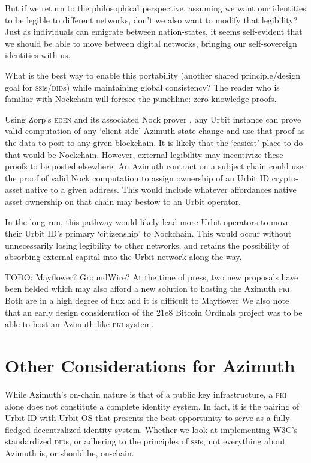 \documentclass[twoside]{article}
\begin{document}
But if we return to the philosophical perspective, assuming we want our identities to be legible to different networks, don't we also want to modify that legibility? Just as individuals can emigrate between nation-states, it seems self-evident that we should be able to move between digital networks, bringing our self-sovereign identities with us.

What is the best way to enable this portability (another shared principle/design goal for \textsc{ssi}s/\textsc{did}s) while maintaining global consistency? The reader who is familiar with Nockchain will foresee the punchline:  zero-knowledge proofs.

Using Zorp's \textsc{eden} and its associated Nock prover \citep{Zorp2023}, any Urbit instance can prove valid computation of any `client-side' Azimuth state change and use that proof as the data to post to any given blockchain. It is likely that the `easiest' place to do that would be Nockchain. However, external legibility may incentivize these proofs to be posted elsewhere. An Azimuth contract on a subject chain could use the proof of valid Nock computation to assign ownership of an Urbit ID crypto-asset native to a given address. This would include whatever affordances native asset ownership on that chain may bestow to an Urbit operator.

In the long run, this pathway would likely lead more Urbit operators to move their Urbit ID's primary `citizenship' to Nockchain. This would occur without unnecessarily losing legibility to other networks, and retains the possibility of absorbing external capital into the Urbit network along the way.

TODO: Mayflower? GroundWire?
At the time of press, two new proposals have been fielded which may also afford a new solution to hosting the Azimuth \textsc{pki}.  Both are in a high degree of flux and it is difficult to   Mayflower
We also note that an early design consideration of the 21e8 Bitcoin Ordinals project was to be able to host an Azimuth-like \textsc{pki} system.

\section{Other Considerations for Azimuth}

While Azimuth's on-chain nature is that of a public key infrastructure, a \textsc{pki} alone does not constitute a complete identity system. In fact, it is the pairing of Urbit ID with Urbit OS that presents the best opportunity to serve as a fully-fledged decentralized identity system. Whether we look at implementing W3C's standardized \textsc{did}s, or adhering to the principles of \textsc{ssi}s, not everything about Azimuth is, or should be, on-chain.
\end{document}
